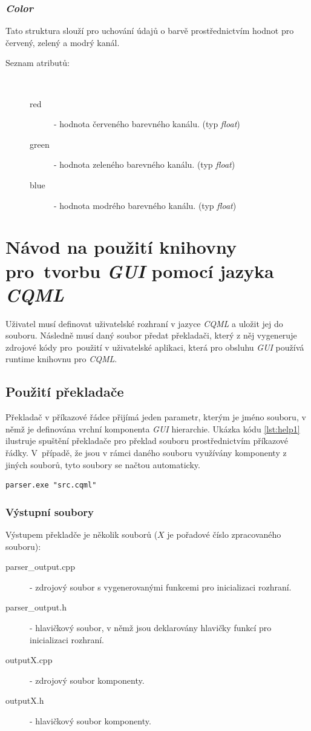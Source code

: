 \documentclass[11pt,twoside,a4paper]{book}
\begin{document}
\subsection{\textit{Color}}
Tato struktura slouží pro uchování údajů o barvě prostřednictvím hodnot pro červený, zelený a modrý kanál.\\
\begin{description}
\item[Seznam atributů:] ~
\begin{description}
\item[red] - hodnota červeného barevného kanálu. (typ \textit{float})
\item[green] - hodnota zeleného barevného kanálu. (typ \textit{float})
\item[blue] - hodnota modrého barevného kanálu. (typ \textit{float})
\end{description}
\end{description}




\chapter[Návod na použití \textit{CQML}]{\label{CH:APD}Návod na použití knihovny pro~tvorbu \textit{GUI} pomocí jazyka \textit{CQML}}
Uživatel musí definovat uživatelské rozhraní v jazyce \textit{CQML} a uložit jej do souboru. Následně musí daný soubor předat překladači, který z něj vygeneruje zdrojové kódy pro~použití v uživatelské aplikaci, která pro obsluhu \textit{GUI} používá runtime knihovnu pro \textit{CQML}.
\section{Použití překladače}
Překladač v příkazové řádce přijímá jeden parametr, kterým je jméno souboru, v němž je definována vrchní komponenta \textit{GUI} hierarchie. Ukázka kódu \ref{lst:help1} ilustruje spuštění překladače pro překlad souboru  prostřednictvím příkazové řádky. V~případě, že jsou v rámci daného souboru využívány komponenty z jiných souborů, tyto soubory se načtou automaticky.
\begin{lstlisting}[frame=single,caption=Spuštění překladače pomocí příkazové řádky.,label=lst:help1]
parser.exe "src.cqml"
\end{lstlisting}
\subsection{Výstupní soubory}
Výstupem překladče je několik souborů ($X$ je pořadové číslo zpracovaného souboru):
\begin{description}
\item[parser\_output.cpp] - zdrojový soubor s vygenerovanými funkcemi pro inicializaci rozhraní.
\item[parser\_output.h] - hlavičkový soubor, v němž jsou deklarovány hlavičky funkcí pro inicializaci rozhraní.
\item[outputX.cpp] - zdrojový soubor komponenty.
\item[outputX.h] - hlavičkový soubor komponenty.
\end{description}
\end{document}
